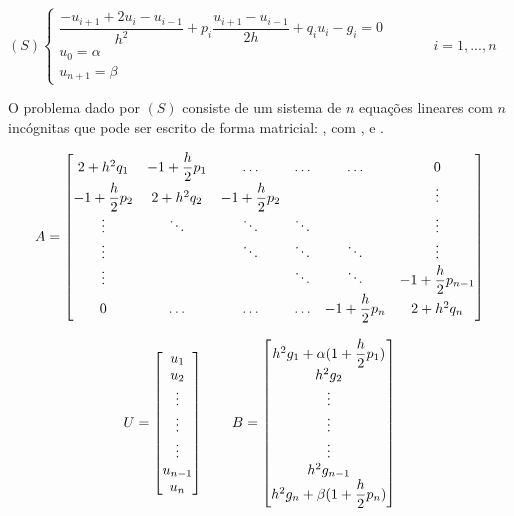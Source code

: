 \begin{center}
	\begin{math}
		(S)
		\left\{
    		\begin{array}{l}
      			\dfrac{-u_{i+1}+ 2u_i - u_{i-1}}{h^2} + p_i\dfrac{u_{i+1} - u_{i-1}}{2h}  + q_i u_i - g_i = 0 \\
				u_0 = \alpha\\
				u_{n+1} = \beta      			
    		\end{array}
    		\begin{array}{l}
      		\qquad \\
			\qquad \\
			\qquad	   
    		\end{array}
    		\begin{array}{l}
      			i = 1, ... , n 
    		\end{array}
		\right.
	\end{math}
\end{center} 

O problema dado por $(S)$ consiste de um sistema de $n$ equações lineares com $n$ incógnitas que pode ser escrito de forma matricial: , com ,  e .


\begin{equation*}
	\cmrtext{A} =
	\begin{bmatrix}
		2+h^2q_1 & -1+\dfrac{h}{2}p_1 & \ldots  & \ldots & \ldots & 0 \\
		-1+\dfrac{h}{2}p_2 & 2+h^2q_2 & -1+\dfrac{h}{2}p_2 &  & & \vdots\\
		\vdots &\ddots&\ddots&\ddots&& \vdots \\
		\vdots &&\ddots&\ddots&\ddots& \vdots \\
		\vdots & & & \ddots & \ddots & -1+\dfrac{h}{2}p_{n-1} \\
		0 & \ldots & \ldots & \ldots & -1+\dfrac{h}{2}p_n & 2+h^2q_n	
	\end{bmatrix}
\end{equation*}

\begin{equation*}
	\cmrtext{U} =
	\begin{bmatrix}
		u_1 \\
		u_2 \\
		\vdots \\
		\vdots \\
		\vdots \\
		u_{n-1} \\
		u_n
	\end{bmatrix}
	\qquad
	\cmrtext{B} =
	\begin{bmatrix}
		h^2g_1 + \alpha(1+\dfrac{h}{2}p_1) \\
		h^2g_2 \\
		\vdots \\
		\vdots \\
		\vdots \\
		h^2g_{n-1} \\
		h^2g_{n} + \beta(1+\dfrac{h}{2}p_n)
	\end{bmatrix}
\end{equation*}

